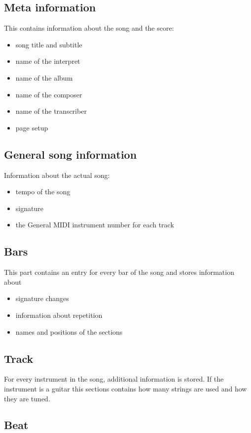 \subsection{Meta information}

This contains information about the song and the score:
\begin{itemize}
	\item song title and subtitle
	\item name of the interpret
	\item name of the album
	\item name of the composer
	\item name of the transcriber
	\item page setup
\end{itemize}

\subsection{General song information}

Information about the actual song: 
\begin{itemize}
	\item tempo of the song
	\item signature
	\item the General MIDI instrument number for each track
\end{itemize}
		
\subsection{Bars}

This part contains an entry for every bar of the song and stores information about
\begin{itemize}
	\item signature changes
	\item information about repetition
	\item names and positions of the sections
\end{itemize}

\subsection{Track}

For every instrument in the song, additional information is stored. If the instrument is a guitar this sections contains how many strings are used and how they are tuned.

\subsection{Beat}

